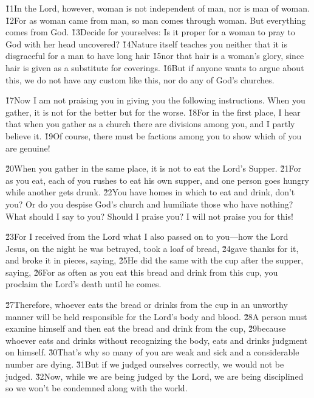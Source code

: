 \v{11}In the Lord, however, woman is not independent of man, nor is man of woman. \v{12}For as woman came from man, so man comes through woman. But everything comes from God. \v{13}Decide for yourselves: Is it proper for a woman to pray to God with her head uncovered? \v{14}Nature itself teaches you neither that it is disgraceful for a man to have long hair \v{15}nor that hair is a woman's glory, since hair is given as a substitute for coverings. \v{16}But if anyone wants to argue about this, we do not have any custom like this, nor do any of God's churches.

\v{17}Now I am not praising you in giving you the following instructions. When you gather, it is not for the better but for the worse. \v{18}For in the first place, I hear that when you gather as a church there are divisions among you, and I partly believe it. \v{19}Of course, there must be factions among you to show which of you are genuine!

\v{20}When you gather in the same place, it is not to eat the Lord's Supper. \v{21}For as you eat, each of you rushes to eat his own supper, and one person goes hungry while another gets drunk. \v{22}You have homes in which to eat and drink, don't you? Or do you despise God's church and humiliate those who have nothing? What should I say to you? Should I praise you? I will not praise you for this!

\v{23}For I received from the Lord what I also passed on to you---how the Lord Jesus, on the night he was betrayed, took a loaf of bread, \v{24}gave thanks for it, and broke it in pieces, saying,   \v{25}He did the same with the cup after the supper, saying,  \v{26}For as often as you eat this bread and drink from this cup, you proclaim the Lord's death until he comes.

\v{27}Therefore, whoever eats the bread or drinks from the cup in an unworthy manner will be held responsible for the Lord's body and blood. \v{28}A person must examine himself and then eat the bread and drink from the cup, \v{29}because whoever eats and drinks without recognizing the body, eats and drinks judgment on himself. \v{30}That's why so many of you are weak and sick and a considerable number are dying. \v{31}But if we judged ourselves correctly, we would not be judged. \v{32}Now, while we are being judged by the Lord, we are being disciplined so we won't be condemned along with the world.

